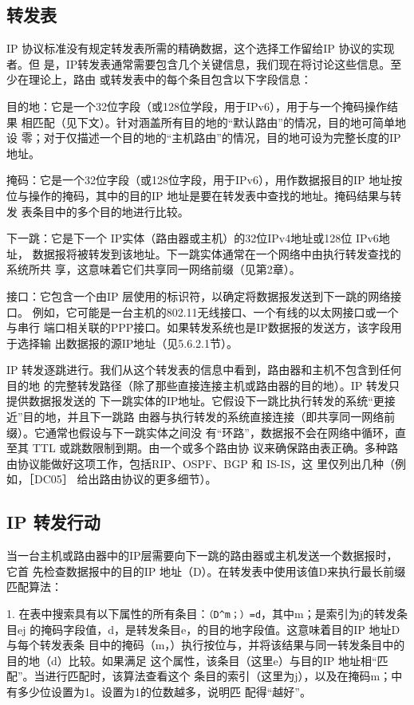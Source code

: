 \subsection{转发表}
IP 协议标准没有规定转发表所需的精确数据，这个选择工作留给IP 协议的实现者。但
是，IP转发表通常需要包含几个关键信息，我们现在将讨论这些信息。至少在理论上，路由
或转发表中的每个条目包含以下字段信息：

目的地：它是一个32位字段（或128位学段，用于IPv6），用于与一个掩码操作结果
相匹配（见下文）。针对涵盖所有目的地的“默认路由”的情况，目的地可简单地设
零；对于仅描述一个目的地的“主机路由”的情况，目的地可设为完整长度的IP地址。

掩码：它是一个32位字段（或128位字段，用于IPv6），用作数据报目的IP 地址按
位与操作的掩码，其中的目的IP 地址是要在转发表中查找的地址。掩码结果与转发
表条目中的多个目的地进行比较。

下一跳：它是下一个 IP实体（路由器或主机）的32位IPv4地址或128位 IPv6地址，
数据报将被转发到该地址。下一跳实体通常在一个网络中由执行转发查找的系统所共
享，这意味着它们共享同一网络前缀（见第2章）。

接口：它包含一个由IP 层使用的标识符，以确定将数据报发送到下一跳的网络接口。
例如，它可能是一台主机的802.11无线接口、一个有线的以太网接口或一个与串行
端口相关联的PPP接口。如果转发系统也是IP数据报的发送方，该字段用于选择输
出数据报的源IP地址（见5.6.2.1节）。

IP 转发逐跳进行。我们从这个转发表的信息中看到，路由器和主机不包含到任何目的地
的完整转发路径（除了那些直接连接主机或路由器的目的地）。IP 转发只提供数据报发送的
下一跳实体的IP地址。它假设下一跳比执行转发的系统“更接近”目的地，并且下一跳路
由器与执行转发的系统直接连接（即共享同一网络前缀）。它通常也假设与下一跳实体之间没
有“环路”，数据报不会在网络中循环，直至其 TTL 或跳数限制到期。由一个或多个路由协
议来确保路由表正确。多种路由协议能做好这项工作，包括RIP、OSPF、BGP 和 IS-IS，这
里仅列出几种（例如，［DC05］ 给出路由协议的更多细节）。

\subsection{IP 转发行动}
当一台主机或路由器中的IP层需要向下一跳的路由器或主机发送一个数据报时，它首
先检查数据报中的目的IP 地址（D）。在转发表中使用该值D来执行最长前缀匹配算法：

1. 在表中搜索具有以下属性的所有条目：\verb|（D^m；）=d|，其中m；是索引为j的转发条目ej
的掩码字段值，d，是转发条目e，的目的地字段值。这意味着目的IP 地址D与每个转发表条
目中的掩码（m，）执行按位与，并将该结果与同一转发条目中的目的地（d）比较。如果满足
这个属性，该条目（这里e）与目的IP 地址相“匹配”。当进行匹配时，该算法查看这个
条目的索引（这里为j），以及在掩码m；中有多少位设置为1。设置为1的位数越多，说明匹
配得“越好”。

